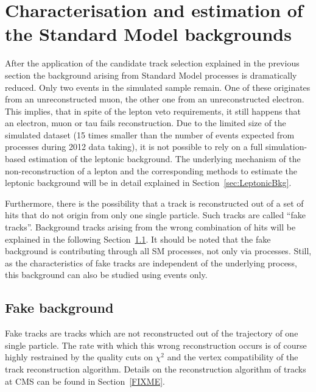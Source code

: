 \chapter{Characterisation and estimation of the Standard Model backgrounds}
\label{sec:BackgroundEstimation}
After the application of the candidate track selection explained in the previous section the background arising from Standard Model processes is dramatically reduced.
Only two events in the simulated \WJets sample remain.
One of these originates from an unreconstructed muon, the other one from an unreconstructed electron.
This implies, that in spite of the lepton veto requirements, it still happens that an electron, muon or tau fails reconstruction.
Due to the limited size of the simulated \WJets dataset (15 times smaller than the number of events expected from \WJets processes during 2012 data taking), 
it is not possible to rely on a full simulation-based estimation of the leptonic background.
The underlying mechanism of the non-reconstruction of a lepton and the corresponding methods to estimate the leptonic background will be in detail explained in Section~\ref{sec:LeptonicBkg}.

Furthermore, there is the possibility that a track is reconstructed out of a set of hits that do not origin from only one single particle.
Such tracks are called ``fake tracks''. 
Background tracks arising from the wrong combination of hits will be explained in the following Section~\ref{sec:FakeBkg}.
It should be noted that the fake background is contributing through all SM processes, not only via \WJets processes.
Still, as the characteristics of fake tracks are independent of the underlying process, this background can also be studied using \WJets events only.



\section{Fake background}
\label{sec:FakeBkg}
Fake tracks are tracks which are not reconstructed out of the trajectory of one single particle.
The rate with which this wrong reconstruction occurs is of course highly restrained by the quality cuts on $\chi^2$ and the vertex compatibility of the track reconstruction algorithm.
Details on the reconstruction algorithm of tracks at CMS can be found in Section~\ref{FIXME}.

